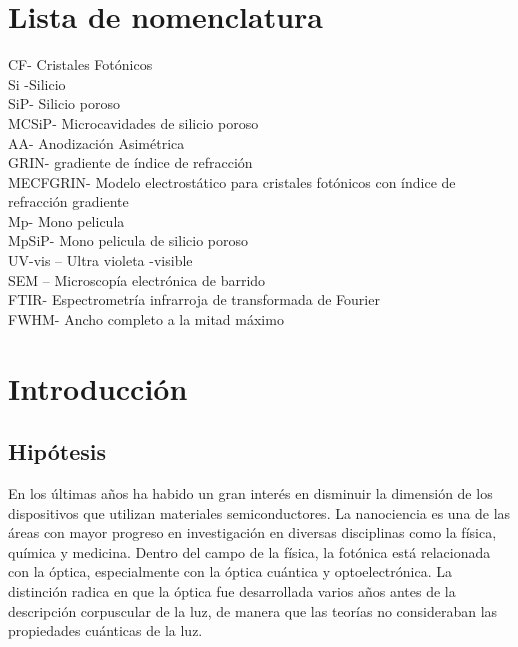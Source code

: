 \documentclass[a4paper,11pt,]{book}
\begin{document}
\chapter*{Lista de nomenclatura}
CF- Cristales Fotónicos\\
Si -Silicio\\ 
SiP- Silicio poroso \\
MCSiP- Microcavidades de silicio poroso \\
AA- Anodización Asimétrica \\
GRIN- gradiente de índice de refracción \\
MECFGRIN- Modelo electrostático para cristales fotónicos con índice de refracción gradiente \\
Mp- Mono pelicula \\
MpSiP- Mono pelicula de silicio poroso \\
UV-vis – Ultra violeta -visible \\
SEM – Microscopía electrónica de barrido \\
FTIR- Espectrometría infrarroja de transformada de Fourier \\
FWHM- Ancho completo a la mitad máximo\\






\tableofcontents
\listoffigures  %
\listoftables %
\renewcommand{\listfigurename}{Índice de Figuras}
\renewcommand{\listtablename}{Índice de Tablas}
\renewcommand{\contentsname}{Lista de Contenidos}
\renewcommand{\tablename}{Tabla}
\mainmatter %
\pagestyle{headings}

 \chapter{Introducci\'on}
 
\section{Hipótesis } 
En los últimas años ha habido un gran interés en disminuir la dimensión de los dispositivos que utilizan materiales semiconductores. La nanociencia es una de las áreas con mayor progreso en investigación en diversas disciplinas como la física, química y medicina. Dentro del campo de la física, la fotónica está relacionada con la óptica, especialmente con la óptica cuántica y optoelectrónica. La distinción radica en que la óptica fue desarrollada varios años antes de la descripción corpuscular de la luz, de manera que las teorías no consideraban las propiedades cuánticas de la luz. 
\end{document}
